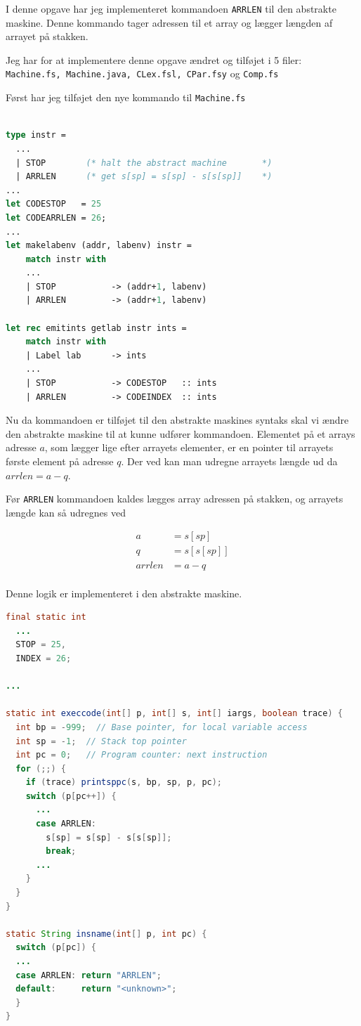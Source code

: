 \documentclass[danish,a4paper]{report}
\begin{document}
I denne opgave har jeg implementeret kommandoen \texttt{ARRLEN} til den abstrakte maskine. Denne kommando tager adressen til et array og lægger længden af arrayet på stakken.

Jeg har for at implementere denne opgave ændret og tilføjet i 5 filer: \texttt{Machine.fs, Machine.java, CLex.fsl, CPar.fsy} og \texttt{Comp.fs}

Først har jeg tilføjet den nye kommando til \texttt{Machine.fs}

\begin{lstlisting}[language=ML]

type instr =
  ...
  | STOP        (* halt the abstract machine       *)
  | ARRLEN      (* get s[sp] = s[sp] - s[s[sp]]    *)
...
let CODESTOP   = 25
let CODEARRLEN = 26;
...
let makelabenv (addr, labenv) instr = 
    match instr with
    ...
    | STOP           -> (addr+1, labenv)
    | ARRLEN         -> (addr+1, labenv)

let rec emitints getlab instr ints = 
    match instr with
    | Label lab      -> ints
    ...
    | STOP           -> CODESTOP   :: ints
    | ARRLEN         -> CODEINDEX  :: ints
\end{lstlisting}

Nu da kommandoen er tilføjet til den abstrakte maskines syntaks skal vi ændre den abstrakte maskine til at kunne udfører kommandoen. Elementet på et arrays adresse $a$, som lægger lige efter arrayets elementer, er en pointer til arrayets første element på adresse $q$. Der ved kan man udregne arrayets længde ud da $arrlen = a-q$.

Før \texttt{ARRLEN} kommandoen kaldes lægges array adressen på stakken, og arrayets længde kan så udregnes ved

\begin{align*}
a &= s[sp]\\
q &= s[s[sp]]\\
arrlen &= a - q\\
\end{align*}

Denne logik er implementeret i den abstrakte maskine.

\begin{lstlisting}[language=java]
final static int 
  ...
  STOP = 25,
  INDEX = 26;

...

static int execcode(int[] p, int[] s, int[] iargs, boolean trace) {
  int bp = -999;  // Base pointer, for local variable access 
  int sp = -1;  // Stack top pointer
  int pc = 0;   // Program counter: next instruction
  for (;;) {
    if (trace) printsppc(s, bp, sp, p, pc);
    switch (p[pc++]) {
      ...
      case ARRLEN:
        s[sp] = s[sp] - s[s[sp]];
        break;
      ...
    }
  }
}

static String insname(int[] p, int pc) {
  switch (p[pc]) {
  ...
  case ARRLEN: return "ARRLEN";
  default:     return "<unknown>";
  }
}
\end{lstlisting}
\end{document}
